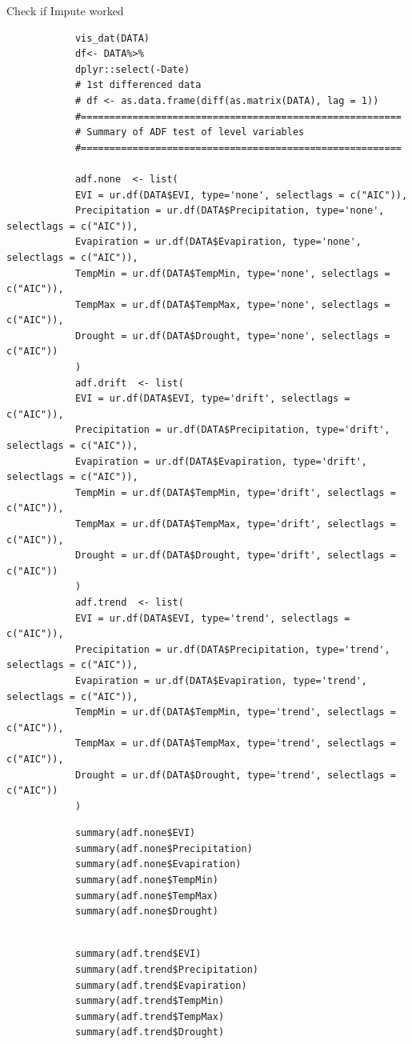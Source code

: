 \documentclass[12pt,a4paper]{book}
\begin{document}
			Check if Impute worked
				\begin{shaded}
				\begin{verbatim}
			vis_dat(DATA)
			df<- DATA%>%
			dplyr::select(-Date)
			# 1st differenced data
			# df <- as.data.frame(diff(as.matrix(DATA), lag = 1))
			#========================================================
			# Summary of ADF test of level variables
			#========================================================
			
			adf.none  <- list(
			EVI = ur.df(DATA$EVI, type='none', selectlags = c("AIC")),
			Precipitation = ur.df(DATA$Precipitation, type='none', selectlags = c("AIC")),
			Evapiration = ur.df(DATA$Evapiration, type='none', selectlags = c("AIC")),
			TempMin = ur.df(DATA$TempMin, type='none', selectlags = c("AIC")),
			TempMax = ur.df(DATA$TempMax, type='none', selectlags = c("AIC")),
			Drought = ur.df(DATA$Drought, type='none', selectlags = c("AIC"))
			)
			adf.drift  <- list(
			EVI = ur.df(DATA$EVI, type='drift', selectlags = c("AIC")),
			Precipitation = ur.df(DATA$Precipitation, type='drift', selectlags = c("AIC")),
			Evapiration = ur.df(DATA$Evapiration, type='drift', selectlags = c("AIC")),
			TempMin = ur.df(DATA$TempMin, type='drift', selectlags = c("AIC")),
			TempMax = ur.df(DATA$TempMax, type='drift', selectlags = c("AIC")),
			Drought = ur.df(DATA$Drought, type='drift', selectlags = c("AIC"))
			)
			adf.trend  <- list(
			EVI = ur.df(DATA$EVI, type='trend', selectlags = c("AIC")),
			Precipitation = ur.df(DATA$Precipitation, type='trend', selectlags = c("AIC")),
			Evapiration = ur.df(DATA$Evapiration, type='trend', selectlags = c("AIC")),
			TempMin = ur.df(DATA$TempMin, type='trend', selectlags = c("AIC")),
			TempMax = ur.df(DATA$TempMax, type='trend', selectlags = c("AIC")),
			Drought = ur.df(DATA$Drought, type='trend', selectlags = c("AIC"))
			)
				\end{verbatim}
		\end{shaded}
	
				\begin{shaded}
				\begin{verbatim}			
			summary(adf.none$EVI)
			summary(adf.none$Precipitation)
			summary(adf.none$Evapiration)
			summary(adf.none$TempMin)
			summary(adf.none$TempMax)
			summary(adf.none$Drought)
			
				\end{verbatim}
		\end{shaded}
	
			
				\begin{shaded}
				\begin{verbatim}
			summary(adf.trend$EVI)
			summary(adf.trend$Precipitation)
			summary(adf.trend$Evapiration)
			summary(adf.trend$TempMin)
			summary(adf.trend$TempMax)
			summary(adf.trend$Drought)			
				\end{verbatim}
		\end{shaded}
\end{document}
